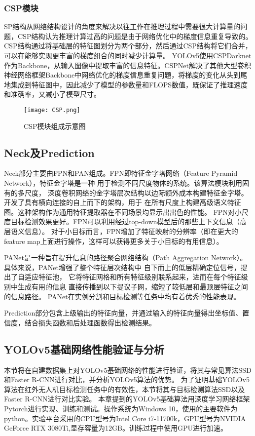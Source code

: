\subsubsection{CSP模块}
SP结构从网络结构设计的角度来解决以往工作在推理过程中需要很大计算量的问题，CSP结构认为推理计算过高的问题是由于网络优化中的梯度信息重复导致的。CSP结构通过将基础层的特征图划分为两个部分，然后通过CSP结构将它们合并，可以在能够实现更丰富的梯度组合的同时减少计算量。
YOLOv5使用CSPDarknet作为Backbone，从输入图像中提取丰富的信息特征。CSPNet解决了其他大型卷积神经网络框架Backbone中网络优化的梯度信息重复问题，将梯度的变化从头到尾地集成到特征图中，因此减少了模型的参数量和FLOPS数值，既保证了推理速度和准确率，又减小了模型尺寸。

\begin{figure}[h]
  \centering
  \texttt{[image: CSP.png]}
  \caption{CSP模块组成示意图}
  \label{csp}
\end{figure}

\subsection{Neck及Prediction}
Neck部分主要由FPN和PAN组成。FPN即特征金字塔网络（Feature Pyramid Network），特征金字塔是一种
用于检测不同尺度物体的系统。该算法模块利用固有的多尺度，
深度卷积网络的金字塔层次结构以边际额外成本构建特征金字塔。开发了具有横向连接的自上而下的架构，用于
在所有尺度上构建高级语义特征图。这种架构作为通用特征提取器在不同场景均显示出出色的性能。
FPN对小尺度目标检测效果更好。FPN可以利用经过top-down模型后的那些上下文信息（高层语义信息）。
对于小目标而言，FPN增加了特征映射的分辨率（即在更大的feature map上面进行操作，这样可以获得更多关于小目标的有用信息）。

PANet是一种旨在提升信息的路径聚合网络结构（Path Aggregation Network）。
具体来说，PANet增强了整个特征层次结构中
自下而上的低层精确定位信号，提出了自适应特征池，
它将特征网格和所有特征级别联系起来，进而在每个特征级别中生成有用的信息
直接传播到以下提议子网，缩短了较低层和最顶层特征之间的信息路径。
PANet在实例分割和目标检测等任务中均有着优秀的性能表现。

Prediction部分包含上级输出的特征向量，并通过输入的特征向量得出坐标值、置信度，结合损失函数和后处理函数得出检测结果。

\subsection{YOLOv5基础网络性能验证与分析}
本节将在自建数据集上对YOLOv5基础网络的性能进行验证，将其与常见算法SSD和Faster R-CNN进行对比，并分析YOLOv5算法的优势。
为了证明基础YOLOv5算法在红外无人机目标检测任务中的有效性，本节将其与目标检测算法SSD以及Faster R-CNN进行对比实验。
本章提到的YOLOv5基础算法用深度学习网络框架Pytorch进行实现、训练和测试。操作系统为Windows 10，使用的主要软件为python。实验平台采用的CPU型号为Intel Core i7-11700k，GPU型号为NVIDIA GeForce RTX 3080Ti,显存容量为12GB。训练过程中使用GPU进行加速。



